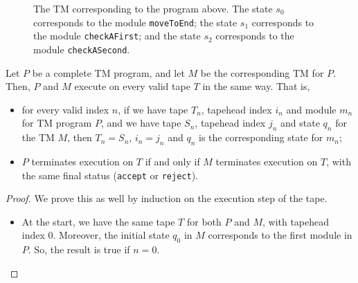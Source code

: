 \begin{appendices}
\begin{figure}[H]
    \caption{The TM corresponding to the program above. The state $s_0$ corresponds to the module \texttt{moveToEnd}; the state $s_1$ corresponds to the module \texttt{checkAFirst}; and the state $s_2$ corresponds to the module \texttt{checkASecond}.}
\end{figure}

\begin{theorem}
    Let $P$ be a complete TM program, and let $M$ be the corresponding TM for $P$. Then, $P$ and $M$ execute on every valid tape $T$ in the same way. That is,
    \begin{itemize}
        \item for every valid index $n$, if we have tape $T_n$, tapehead index $i_n$ and module $m_n$ for TM program $P$, and we have tape $S_n$, tapehead index $j_n$ and state $q_n$ for the TM $M$, then $T_n = S_n$, $i_n = j_n$ and $q_n$ is the corresponding state for $m_n$;
        \item $P$ terminates execution on $T$ if and only if $M$ terminates execution on $T$, with the same final status (\texttt{accept} or \texttt{reject}).
    \end{itemize}
\end{theorem}
\begin{proof}
    We prove this as well by induction on the execution step of the tape. 
    \begin{itemize}
        \item At the start, we have the same tape $T$ for both $P$ and $M$, with tapehead index $0$. Moreover, the initial state $q_0$ in $M$ corresponds to the first module in $P$. So, the result is true if $n = 0$. 
        

\end{itemize}
\end{proof}
\end{appendices}
